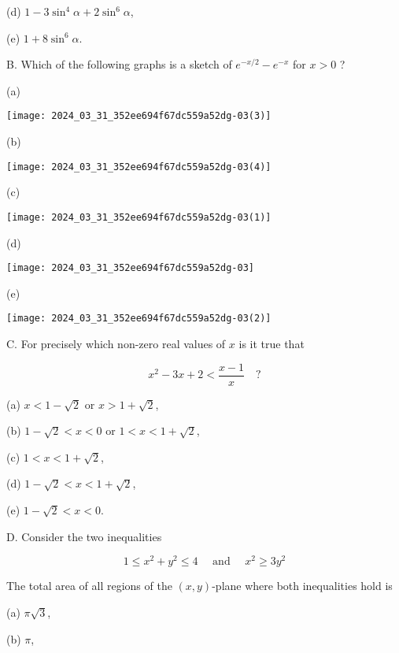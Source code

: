 \documentclass[10pt]{article}
\begin{document}
(d) $1-3 \sin ^{4} \alpha+2 \sin ^{6} \alpha$,

(e) $1+8 \sin ^{6} \alpha$.

B. Which of the following graphs is a sketch of $e^{-x / 2}-e^{-x}$ for $x>0$ ?

(a)

\begin{center}
\texttt{[image: 2024\_03\_31\_352ee694f67dc559a52dg-03(3)]}
\end{center}

(b)

\begin{center}
\texttt{[image: 2024\_03\_31\_352ee694f67dc559a52dg-03(4)]}
\end{center}

(c)

\begin{center}
\texttt{[image: 2024\_03\_31\_352ee694f67dc559a52dg-03(1)]}
\end{center}

(d)

\begin{center}
\texttt{[image: 2024\_03\_31\_352ee694f67dc559a52dg-03]}
\end{center}

(e)

\begin{center}
\texttt{[image: 2024\_03\_31\_352ee694f67dc559a52dg-03(2)]}
\end{center}

C. For precisely which non-zero real values of $x$ is it true that

$$
x^{2}-3 x+2<\frac{x-1}{x} \quad ?
$$

(a) $x<1-\sqrt{2}$ or $x>1+\sqrt{2}$,

(b) $1-\sqrt{2}<x<0$ or $1<x<1+\sqrt{2}$,

(c) $1<x<1+\sqrt{2}$,

(d) $1-\sqrt{2}<x<1+\sqrt{2}$,

(e) $1-\sqrt{2}<x<0$.

D. Consider the two inequalities

$$
1 \leq x^{2}+y^{2} \leq 4 \quad \text { and } \quad x^{2} \geq 3 y^{2}
$$

The total area of all regions of the $(x, y)$-plane where both inequalities hold is

(a) $\pi \sqrt{3}$,

(b) $\pi$,
\end{document}
